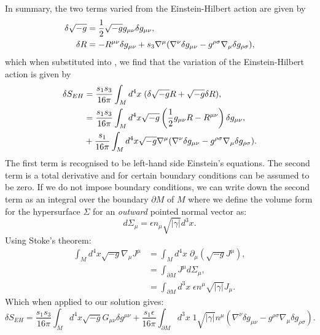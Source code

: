 In summary, the two terms varied from the Einstein-Hilbert action are given by
\begin{equation}
	\begin{aligned}
		\delta \sqrt{-g} &= \frac{1}{2} \sqrt{-g} g_{\mu \nu} \delta g_{\mu \nu}, \\
		\delta R &= -R^{\mu \nu} \delta g_{\mu \nu} + s_3 \nabla^\mu (\nabla^\nu \delta g_{\mu \nu} - g^{\rho \sigma} \nabla_\mu \delta g_{\rho \sigma}),
	\end{aligned}
\end{equation}
which when substituted into , we find that the variation of the Einstein-Hilbert action is given by
\begin{equation*}
\begin{aligned}
	\delta S_{EH} &= \frac{s_1 s_3}{16 \pi} \int_M d^4 x \; ( \delta \sqrt{-g} R + \sqrt{-g} \delta R ) , \\
	&= \frac{s_1 s_3}{16 \pi} \int_M d^4 x \sqrt{-g} \left(\frac{1}{2} g_{\mu \nu} R - R^{\mu \nu} \right) \delta g_{\mu \nu} ,  \\
	& + \frac{s_1}{16 \pi} \int_M d^4 x \sqrt{-g} \nabla^\mu (\nabla^\nu \delta g_{\mu \nu} - g^{\rho \sigma} \nabla_\mu \delta g_{\rho \sigma}) .
\end{aligned}
\end{equation*}
The first term is recognised to be left-hand side Einstein's equations. The second term is a total derivative and for certain boundary conditions can be assumed to be zero. If we do not impose boundary conditions, we can write down the second term as an integral over the boundary $\partial M$ of $M$ where we define the volume form for the hypersurface $\Sigma$ for an \textit{outward} pointed normal vector as:
\begin{equation*}
	d \Sigma_\mu = \epsilon n_\mu \sqrt{|\gamma|} d^3 x.
\end{equation*} 
Using Stoke's theorem:
\begin{equation*}
\begin{aligned}
		\int_M d^4 x \sqrt{-g} \nabla_\mu J^\mu &= \int_M d^4 x \; \partial_\mu (\sqrt{-g} J^\mu) ,\\
		&= \int_{\partial M} J^\mu d \Sigma_\mu,  \\
		&= \int_{\partial M}d^3 x \; \epsilon n^\mu \sqrt{|\gamma|} J_\mu .
\end{aligned}
\end{equation*}
Which when applied to our solution gives:
\begin{equation}
		\delta S_{EH} = \frac{s_1 s_3}{16 \pi} \int_M  d^4x \sqrt{-g} G_{\mu \nu} \delta g^{\mu \nu} + \frac{s_1 \epsilon}{16 \pi} \int_{\partial M}  d^3x \; 1\sqrt{|\gamma|} n^\mu (\nabla^\nu \delta g_{\mu \nu} - g^{\rho \sigma} \nabla_\mu \delta g_{\rho \sigma}) .
\end{equation}
